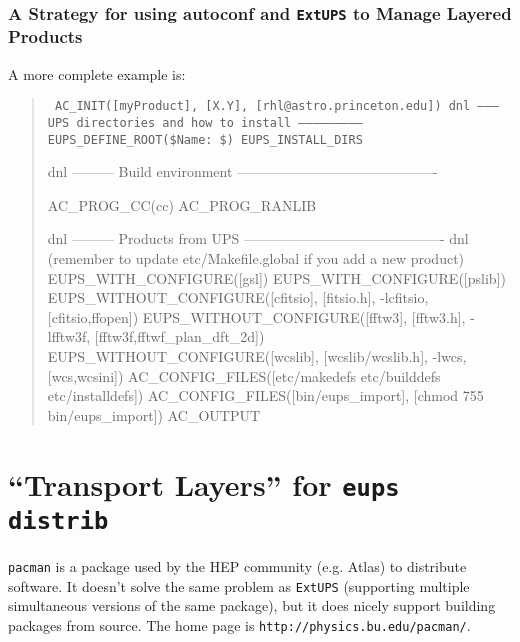 \documentclass{article}
\newcommand{\code}[1]{\texttt{#1}}
\newcommand{\eups}{\code{ExtUPS}}
\newcommand{\pacman}{\code{pacman}}
\begin{document}
\subsubsection{A Strategy for using autoconf and \eups{} to Manage Layered Products}


A more complete example is:

\begin{quote}
    \obeylines\tt\small\parskip=0pt
AC\_INIT([myProduct], [X.Y], [rhl@astro.princeton.edu])
\vspace{5pt}
dnl --------- UPS directories and how to install --------------------------
\vspace{5pt}
EUPS\_DEFINE\_ROOT(\${Name}:  \$)
EUPS\_INSTALL\_DIRS   
\vspace{5pt}

dnl --------- Build environment -------------------------------------------

AC\_PROG\_CC(cc)
AC\_PROG\_RANLIB

dnl --------- Products from UPS -------------------------------------------
dnl (remember to update etc/Makefile.global if you add a new product)
\vspace{5pt}
EUPS\_WITH\_CONFIGURE([gsl])
EUPS\_WITH\_CONFIGURE([pslib])
\vspace{5pt}
EUPS\_WITHOUT\_CONFIGURE([cfitsio], [fitsio.h],
                        -lcfitsio, [cfitsio,ffopen])
EUPS\_WITHOUT\_CONFIGURE([fftw3],   [fftw3.h],
                        -lfftw3f,  [fftw3f,fftwf\_plan\_dft\_2d])
EUPS\_WITHOUT\_CONFIGURE([wcslib],  [wcslib/wcslib.h],
                        -lwcs,     [wcs,wcsini])
\vspace{5pt}
AC\_CONFIG\_FILES([etc/makedefs etc/builddefs etc/installdefs])
AC\_CONFIG\_FILES([bin/eups\_import], [chmod 755 bin/eups\_import])
\vspace{5pt}
AC\_OUTPUT
\end{quote}

\section{``Transport Layers'' for \code{eups distrib}}
\label{pacman}

\pacman{} is a package used by the HEP community (e.g. Atlas) to distribute
software.  It doesn't solve the same problem as \eups{} (supporting 
multiple simultaneous versions of the same package), but it does nicely
support building packages from source.  The home page is \code{http://physics.bu.edu/pacman/}.
\end{document}
